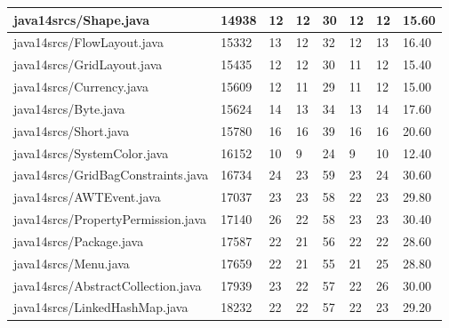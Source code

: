 \begin{tabular}{|l|l|l|l|l|l|l|l|}
\hline
java14srcs/Shape.java                              & 14938       & 12        & 12        & 30        & 12        & 12        & 15.60     \\
\hline
java14srcs/FlowLayout.java                         & 15332       & 13        & 12        & 32        & 12        & 13        & 16.40     \\
\hline
java14srcs/GridLayout.java                         & 15435       & 12        & 12        & 30        & 11        & 12        & 15.40     \\
\hline
java14srcs/Currency.java                           & 15609       & 12        & 11        & 29        & 11        & 12        & 15.00     \\
\hline
java14srcs/Byte.java                               & 15624       & 14        & 13        & 34        & 13        & 14        & 17.60     \\
\hline
java14srcs/Short.java                              & 15780       & 16        & 16        & 39        & 16        & 16        & 20.60     \\
\hline
java14srcs/SystemColor.java                        & 16152       & 10        & 9         & 24        & 9         & 10        & 12.40     \\
\hline
java14srcs/GridBagConstraints.java                 & 16734       & 24        & 23        & 59        & 23        & 24        & 30.60     \\
\hline
java14srcs/AWTEvent.java                           & 17037       & 23        & 23        & 58        & 22        & 23        & 29.80     \\
\hline
java14srcs/PropertyPermission.java                 & 17140       & 26        & 22        & 58        & 23        & 23        & 30.40     \\
\hline
java14srcs/Package.java                            & 17587       & 22        & 21        & 56        & 22        & 22        & 28.60     \\
\hline
java14srcs/Menu.java                               & 17659       & 22        & 21        & 55        & 21        & 25        & 28.80     \\
\hline
java14srcs/AbstractCollection.java                 & 17939       & 23        & 22        & 57        & 22        & 26        & 30.00     \\
\hline
java14srcs/LinkedHashMap.java                      & 18232       & 22        & 22        & 57        & 22        & 23        & 29.20     \\

\end{tabular}
